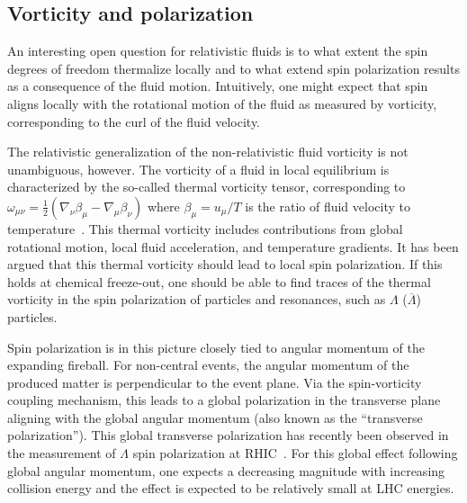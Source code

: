 \subsection{Vorticity and polarization}

An interesting open question for relativistic fluids is to what extent the 
  spin degrees of freedom thermalize locally and to what extend spin 
  polarization results as a consequence of the fluid motion. 
Intuitively, one might expect that spin aligns locally with the rotational 
  motion of the fluid as measured by vorticity, corresponding to the curl 
  of the fluid velocity.

The relativistic generalization of the non-relativistic fluid vorticity is 
  not unambiguous, however. 
The vorticity of a fluid in local equilibrium is characterized by the so-called 
  thermal vorticity tensor, corresponding to $\omega_{\mu\nu} = \frac{1}{2} 
  (\nabla_\nu \beta_\mu - \nabla_\mu \beta_\nu)$ where $\beta_\mu=u_\mu / T$ 
  is the ratio of fluid velocity to temperature~\cite{Becattini:2013fla}. 
This thermal vorticity includes contributions from global rotational motion, 
  local fluid acceleration, and temperature gradients. 
It has been argued that this thermal vorticity should lead to local 
  spin polarization. 
If this holds at chemical freeze-out, one should be able to find traces of the 
  thermal vorticity in the spin polarization of particles and resonances, 
  such as $\Lambda$ ($\overline{\Lambda}$) particles.

Spin polarization is in this picture closely tied to angular momentum of the 
  expanding fireball. 
For non-central events, the angular momentum of the produced matter 
  is perpendicular to the event plane. 
Via the spin-vorticity coupling mechanism, this leads to a global polarization 
  in the transverse plane aligning with the global angular momentum (also known 
  as the ``transverse polarization''). 
This global transverse polarization has recently been observed in the measurement 
  of $\Lambda$ spin polarization at RHIC~\cite{STAR:2017ckg}. 
For this global effect following global angular momentum, one expects a 
  decreasing magnitude with increasing collision energy and the effect is 
  expected to be relatively small at LHC energies. 

